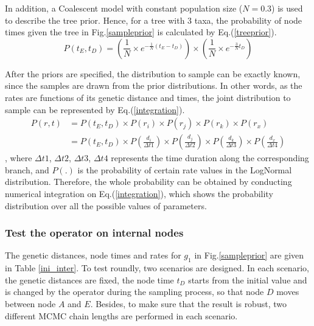 \documentclass{bmcart}
\begin{document}
In addition, a Coalescent model with constant population size ($N=0.3$) is used to describe the tree prior. Hence, for a tree with 3 taxa, the probability of node times given the tree in Fig.\ref{sampleprior} is calculated by Eq.(\ref{treeprior}).
\begin{equation}\label{treeprior}
P({t_E},{t_D}) = (\frac{1}{N} \times {e^{ - \frac{1}{N}({t_E} - {t_D})}}) \times (\frac{1}{N} \times {e^{ - \frac{3}{N}{t_D}}})
\end{equation}

After the priors are specified, the distribution to sample can be exactly known, since the samples are drawn from the prior distributions. In other words, as the rates are functions of its genetic distance and times, the joint distribution to sample can be represented by Eq.(\ref{integration}).
\begin{equation}\label{integration}
\begin{aligned}
P(r,t) &= P({t_E},{t_D}) \times P({r_i}) \times P({r_j}) \times P({r_k}) \times P({r_x}) \\&= P({t_E},{t_D}) \times P(\frac{{{d_i}}}{{\Delta t1}}) \times P(\frac{{{d_j}}}{{\Delta t2}}) \times P(\frac{{{d_k}}}{{\Delta t3}}) \times P(\frac{{{d_x}}}{{\Delta t4}})
\end{aligned}
\end{equation}
, where ${\Delta t1}$, ${\Delta t2}$, ${\Delta t3}$, ${\Delta t4}$ represents the time duration along the corresponding branch, and $P({.})$ is the probability of certain rate values in the LogNormal distribution. Therefore, the whole probability can be obtained by conducting numerical integration on Eq.(\ref{integration}), which shows the probability distribution over all the possible values of parameters.
\subsubsection*{Test the operator on internal nodes}
The genetic distances, node times and rates for $g_1$ in Fig.\ref{sampleprior} are given in Table \ref{ini_inter}. To test roundly, two scenarios are designed. In each scenario, the genetic distances are fixed, the node time $t_D$ starts from the initial value and is changed by the operator during the sampling process, so that node $D$ moves between node $A$ and $E$. Besides, to make sure that the result is robust, two different MCMC chain lengths are performed in each scenario.
\end{document}
